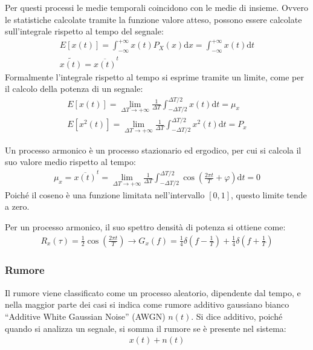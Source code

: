 \documentclass{article}
\newcommand{\df}{\mathrm{d}}
\numberwithin{equation}{subsection}
\begin{document}
Per questi processi le medie temporali coincidono con le medie di insieme. Ovvero le statistiche calcolate tramite la funzione valore atteso, possono essere 
calcolate sull'integrale rispetto al tempo del segnale:
\begin{gather*}
    E[x(t)]=\displaystyle\int_{-\infty}^{+\infty}x(t)P_X(x)\df x=\int_{-\infty}^{+\infty}x(t)\df t\\
    \widetilde{x(t)}=\overline{x(t)}^t
\end{gather*}
Formalmente l'integrale rispetto al tempo si esprime tramite un limite, come per il calcolo della potenza di un segnale:
\begin{gather*}
    E[x(t)]=\lim_{\Delta T\to+\infty}\displaystyle\frac{1}{\Delta T}\int_{-\Delta T/2}^{\Delta T/2}x(t)\df t=\mu_x\\
    E[x^2(t)]=\lim_{\Delta T\to+\infty}\displaystyle\frac{1}{\Delta T}\int_{-\Delta T/2}^{\Delta T/2}x^2(t)\df t=P_x
\end{gather*}


Un processo armonico è un processo stazionario ed ergodico, per cui si calcola il suo valore medio rispetto al tempo:
\begin{gather*}
    \mu_x=\overline{x(t)}^t=\lim_{\Delta T\to+\infty}\displaystyle\frac{1}{\Delta T}\int_{-\Delta T/2}^{\Delta T/2}\cos\left(\frac{2\pi t}{T}+\varphi\right)\df t=0
\end{gather*}
Poiché il coseno è una funzione limitata nell'intervallo $[0,1]$, questo limite tende a zero. 


Per un processo armonico, il suo spettro densità di potenza si ottiene come:
\begin{gather*}
    R_x(\tau)=\displaystyle\frac{1}{2}\cos\left(\frac{2\pi t}{T}\right)\to G_x(f)=\displaystyle\frac{1}{4}\delta\left(f-\frac{1}{T}\right)+\frac{1}{4}\delta\left(f+\frac{1}{T}\right)
\end{gather*}

\subsubsection{Rumore}
Il rumore viene classificato come un processo aleatorio, dipendente dal tempo, e nella maggior parte dei casi si indica come rumore additivo gaussiano bianco 
``Additive White Gaussian Noise'' (AWGN) $n(t)$. 
Si dice additivo, poiché quando si analizza un segnale, si somma il rumore se è presente nel sistema:
\begin{gather*}
    x(t)+n(t)
\end{gather*} 
\end{document}
